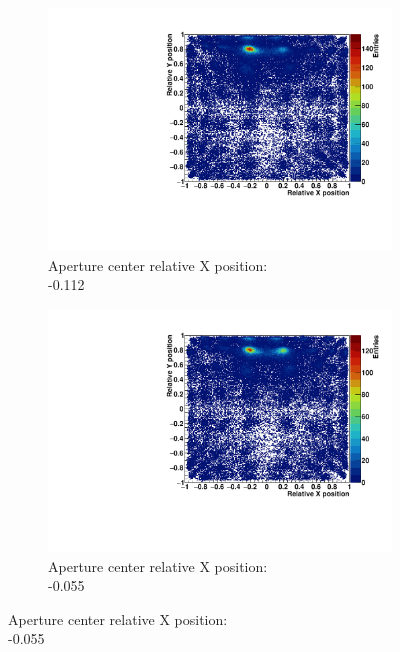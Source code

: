 \begin{figure}
\begin{subfigure}[t]{0.32\textwidth}
\centering
\includegraphics[width=\textwidth]{03_GraphicFiles/chapter3_CLaRySproto/Absorber/images_scan/point_1mm/run00265_floodMap.pdf}
\caption{Aperture center relative X position: \\ -0.112}
\label{chap3::fig::scan_map3_1mm_point}
\end{subfigure}
\newline
\begin{subfigure}[t]{0.32\textwidth}
\centering
\includegraphics[width=\textwidth]{03_GraphicFiles/chapter3_CLaRySproto/Absorber/images_scan/point_1mm/run00266_floodMap.pdf}
\caption{Aperture center relative X position: \\ -0.055}
\label{chap3::fig::scan_map4_1mm_point}
\end{subfigure}

\end{figure}

